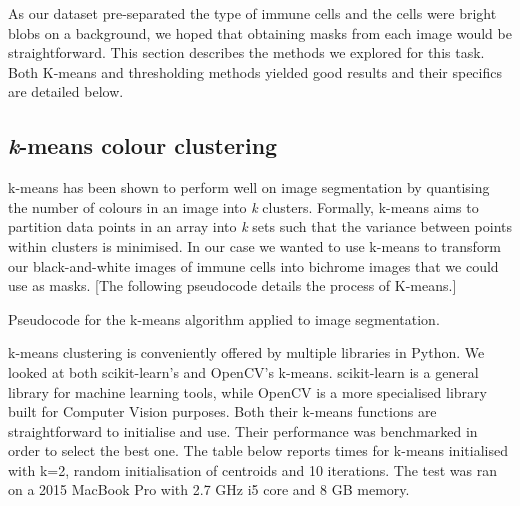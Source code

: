 As our dataset pre-separated the type of immune cells and the cells were bright blobs on a background, we hoped that obtaining masks from each image would be straightforward. This section describes the methods we explored for this task. Both K-means and thresholding methods yielded good results and their specifics are detailed below.

\subsection{\textit{k}-means colour clustering}

k-means has been shown to perform well on image segmentation by quantising the number of colours in an image into \textit{k} clusters. Formally, k-means aims to partition data points in an array into \textit{k} sets such that the variance between points within clusters is minimised. In our case we wanted to use k-means to transform our black-and-white images of immune cells into bichrome images that we could use as masks. [The following pseudocode details the process of K-means.]

\begin{algorithm}
    \DontPrintSemicolon

\caption{Pseudocode for the k-means algorithm applied to image segmentation.}
\label{alg:kmeans}
\end{algorithm}

k-means clustering is conveniently offered by multiple libraries in Python. We looked at both scikit-learn's and OpenCV's k-means. scikit-learn is a general library  for machine learning tools, while OpenCV is a more specialised library built for Computer Vision purposes. Both their k-means functions are straightforward to initialise and use. Their performance was benchmarked in order to select the best one. The table below reports times for k-means initialised with k=2, random initialisation of centroids and 10 iterations. The test was ran on a 2015 MacBook Pro with 2.7 GHz i5 core and 8 GB memory.

